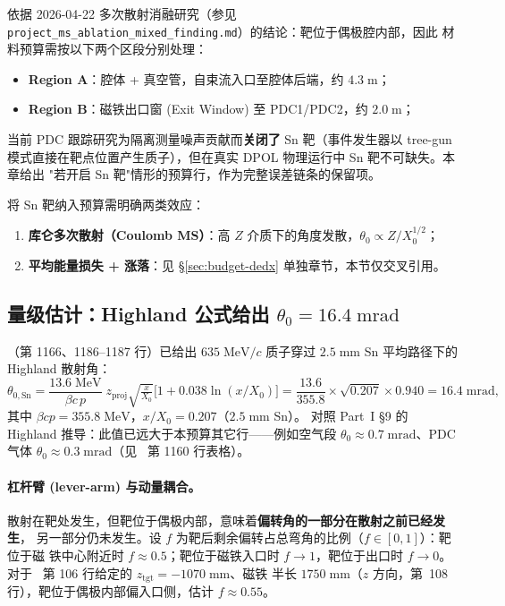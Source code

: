 依据 2026-04-22 多次散射消融研究（参见
\texttt{project\_ms\_ablation\_mixed\_finding.md}）的结论：靶位于偶极腔内部，因此
材料预算需按以下两个区段分别处理：
\begin{itemize}
  \item \textbf{Region A}：腔体 + 真空管，自束流入口至腔体后端，约 $4.3\;\mathrm{m}$；
  \item \textbf{Region B}：磁铁出口窗 (Exit Window) 至 PDC1/PDC2，约 $2.0\;\mathrm{m}$；
\end{itemize}
当前 PDC 跟踪研究为隔离测量噪声贡献而\textbf{关闭了} Sn 靶（事件发生器以 tree-gun
模式直接在靶点位置产生质子），但在真实 DPOL 物理运行中 Sn 靶不可缺失。本章给出
"若开启 Sn 靶"情形的预算行，作为完整误差链条的保留项。

将 Sn 靶纳入预算需明确两类效应：
\begin{enumerate}
  \item \textbf{库仑多次散射（Coulomb MS）}：高 $Z$ 介质下的角度发散，$\theta_0 \propto Z/X_0^{1/2}$；
  \item \textbf{平均能量损失 + 涨落}：见 §\ref{sec:budget-dedx} 单独章节，本节仅交叉引用。
\end{enumerate}

\subsection{量级估计：Highland 公式给出 \texorpdfstring{$\theta_0 = 16.4\;\mathrm{mrad}$}{theta0=16.4 mrad}}
\label{sec:budget-sn-ms-magnitude}

\StatusReport{}（第 1166、1186--1187 行）已给出 $635\;\mathrm{MeV}/c$ 质子穿过
$2.5\;\mathrm{mm}$ Sn 平均路径下的 Highland 散射角：
\begin{equation}
  \theta_{0,\mathrm{Sn}}
   = \frac{13.6\;\mathrm{MeV}}{\beta c\,p}\;z_\mathrm{proj}
       \sqrt{\tfrac{x}{X_0}}
       \bigl[1 + 0.038\ln(x/X_0)\bigr]
   = \frac{13.6}{355.8}\times \sqrt{0.207}\times 0.940
   = 16.4\;\mathrm{mrad},
\label{eq:highland-sn}
\end{equation}
其中 $\beta c p = 355.8\;\mathrm{MeV}$，$x/X_0 = 0.207$（$2.5\;\mathrm{mm}$ Sn）。
对照 Part~I §9 的 Highland 推导：此值已远大于本预算其它行——例如空气段 $\theta_0
\approx 0.7\;\mathrm{mrad}$、PDC 气体 $\theta_0 \approx 0.3\;\mathrm{mrad}$（见
\StatusReport{}~第 1160 行表格）。

\paragraph{杠杆臂 (lever-arm) 与动量耦合。}
散射在靶处发生，但靶位于偶极内部，意味着\textbf{偏转角的一部分在散射之前已经发生}，
另一部分仍未发生。设 $f$ 为靶后剩余偏转占总弯角的比例（$f \in [0,1]$）：靶位于磁
铁中心附近时 $f \approx 0.5$；靶位于磁铁入口时 $f \to 1$，靶位于出口时 $f \to 0$。
对于 \StatusReport{}~第 106 行给定的 $z_\mathrm{tgt} = -1070\;\mathrm{mm}$、磁铁
半长 $1750\;\mathrm{mm}$（$z$ 方向，第~108 行），靶位于偶极内部偏入口侧，估计
$f \approx 0.55$。

